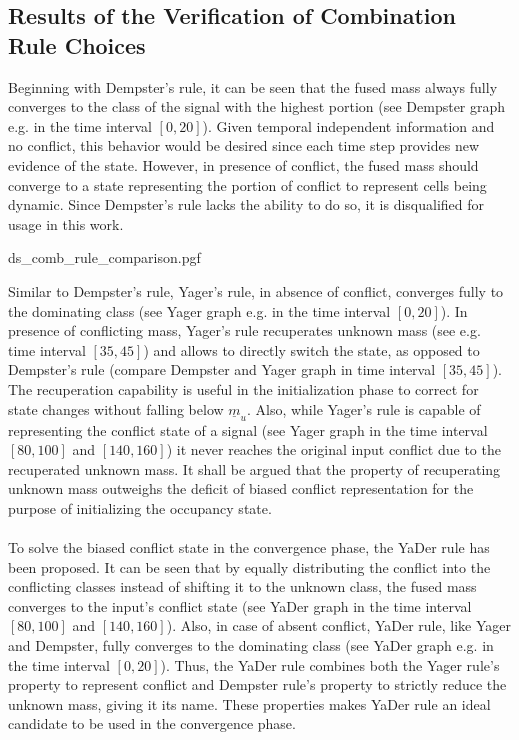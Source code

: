 \subsection{Results of the Verification of Combination Rule Choices}
\label{subsec:results_choice_comb_rule}
Beginning with Dempster's rule, it can be seen that the fused mass always fully converges to the class of the signal with the highest portion (see Dempster graph e.g. in the time interval $[0, 20]$). Given temporal independent information and no conflict, this behavior would be desired since each time step provides new evidence of the state. However, in presence of conflict, the fused mass should converge to a state representing the portion of conflict to represent cells being dynamic. Since Dempster's rule lacks the ability to do so, it is disqualified for usage in this work.
\begin{center}
	{ds_comb_rule_comparison.pgf}
\end{center}
Similar to Dempster's rule, Yager's rule, in absence of conflict, converges fully to the dominating class (see Yager graph e.g. in the time interval $[0, 20]$). In presence of conflicting mass, Yager's rule recuperates unknown mass (see e.g. time interval $[35, 45]$) and allows to directly switch the state, as opposed to Dempster's rule (compare Dempster and Yager graph in time interval $[35, 45]$). The recuperation capability is useful in the initialization phase to correct for state changes without falling below $\underline{m}_u$. Also, while Yager's rule is capable of representing the conflict state of a signal (see Yager graph in the time interval $[80, 100]$ and $[140, 160]$) it never reaches the original input conflict due to the recuperated unknown mass. It shall be argued that the property of recuperating unknown mass outweighs the deficit of biased conflict representation for the purpose of initializing the occupancy state.  
\\\\
To solve the biased conflict state in the convergence phase, the YaDer rule has been proposed. It can be seen that by equally distributing the conflict into the conflicting classes instead of shifting it to the unknown class, the fused mass converges to the input's conflict state (see YaDer graph in the time interval $[80, 100]$ and $[140, 160]$). Also, in case of absent conflict, YaDer rule, like Yager and Dempster, fully converges to the dominating class (see YaDer graph e.g. in the time interval $[0,20]$). Thus, the YaDer rule combines both the Yager rule's property to represent conflict and Dempster rule's property to strictly reduce the unknown mass, giving it its name. These properties makes YaDer rule an ideal candidate to be used in the convergence phase.

